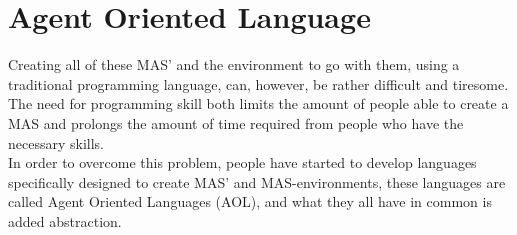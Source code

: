 \chapter{Agent Oriented Language}
Creating all of these MAS' and the environment to go with them, using a traditional programming language, can, however, be rather difficult and tiresome. The need for programming skill both limits the amount of people able to create a MAS and prolongs the amount of time required from people who have the necessary skills.\\
\indent In order to overcome this problem, people have started to develop languages specifically designed to create MAS' and MAS-environments, these languages are called Agent Oriented Languages (AOL), and what they all have in common is added abstraction. 